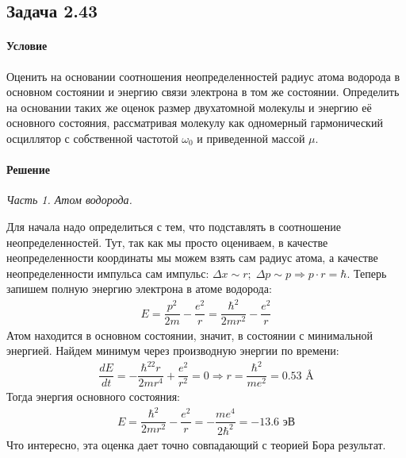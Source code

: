 \documentclass[12pt]{article}
\begin{document}
\subsection{Задача 2.43}
\label{task_2.43}
\paragraph{Условие} Оценить на основании соотношения неопределенностей радиус атома водорода в основном состоянии и энергию связи электрона в том же состоянии. Определить на основании таких же оценок размер двухатомной молекулы и энергию её основного состояния, рассматривая молекулу как одномерный гармонический осциллятор с собственной частотой $\omega_0$ и приведенной массой $\mu$.
\paragraph{Решение}
\textit{Часть 1. Атом водорода.}

\vspace{3mm} \noindent
Для начала надо определиться с тем, что подставлять в соотношение неопределенностей. Тут, так как мы просто оцениваем, в качестве неопределенности координаты мы можем взять сам радиус атома, а качестве неопределенности импульса сам импульс: $\Delta x \sim r; \; \Delta p \sim p \Rightarrow p\cdot r = \hbar $. Теперь запишем полную энергию электрона в атоме водорода:
\begin{gather*}
    E = \dfrac{p^2}{2m} - \dfrac{e^2}{r} = \dfrac{\hbar^2}{2mr^2} - \dfrac{e^2}{r}
\end{gather*}
Атом находится в основном состоянии, значит, в состоянии с минимальной энергией. Найдем минимум через производную энергии по времени:
\begin{gather*}
    \dfrac{dE}{dt} = -\dfrac{\hbar^22r}{2mr^4} + \dfrac{e^2}{r^2} = 0 \Rightarrow r = \dfrac{\hbar^2}{me^2}=0.53 \text{ \AA}
\end{gather*}
Тогда энергия основного состояния:
\begin{gather*}
     E = \dfrac{\hbar^2}{2mr^2} - \dfrac{e^2}{r} = -\dfrac{me^4}{2\hbar^2} = -13.6\text{ эВ}
\end{gather*}
Что интересно, эта оценка дает точно совпадающий с теорией Бора результат.
\end{document}
